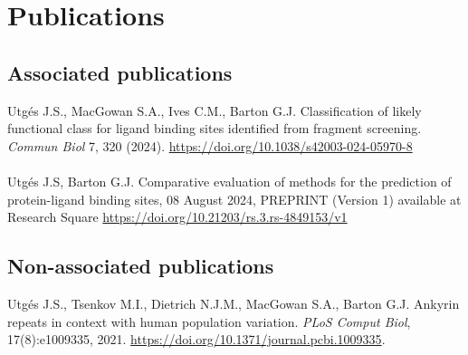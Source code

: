 \chapter*{Publications}

\section*{Associated publications}

Utgés J.S., MacGowan S.A., Ives C.M., Barton G.J. Classification of likely functional class for ligand binding sites identified from fragment screening. \textit{Commun Biol} 7, 320 (2024). \url{https://doi.org/10.1038/s42003-024-05970-8}
\\\\ 
\noindent
Utgés J.S, Barton G.J. Comparative evaluation of methods for the prediction of protein-ligand binding sites, 08 August 2024, PREPRINT (Version 1) available at Research Square \url{https://doi.org/10.21203/rs.3.rs-4849153/v1}

\section*{Non-associated publications}

Utgés J.S., Tsenkov M.I., Dietrich N.J.M., MacGowan S.A., Barton G.J. Ankyrin repeats in context with human population variation. \textit{PLoS Comput Biol}, 17(8):e1009335, 2021. \url{https://doi.org/10.1371/journal.pcbi.1009335}.